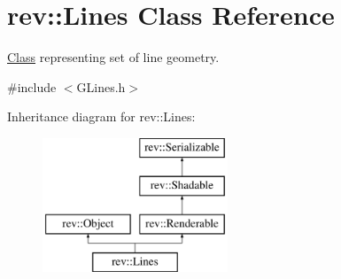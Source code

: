 \hypertarget{classrev_1_1_lines}{}\section{rev\+::Lines Class Reference}
\label{classrev_1_1_lines}


\mbox{\hyperlink{struct_class}{Class}} representing set of line geometry.  




{\ttfamily \#include $<$G\+Lines.\+h$>$}

Inheritance diagram for rev\+::Lines\+:\begin{figure}[H]
\begin{center}
\leavevmode
\includegraphics[height=4.000000cm]{classrev_1_1_lines}
\end{center}
\end{figure}
